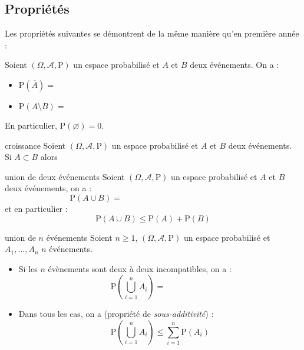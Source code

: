 \documentclass[french,11pt,twoside]{VcCours}
\renewcommand{\P}{\text{P}}
\begin{document}
 




\subsection{Propriétés}
Les propriétés suivantes se démontrent de la même manière qu'en première année : 

\begin{Proposition}{}\label{Prop1}
Soient $(\Omega, \mathcal{A}, \P)$ un espace probabilisé et $A$ et $B$ deux événements. On a :
\begin{itemize}
\item $\P(\overline{A})=$\phantom{$1-P(A)$.}
\item $\P(A \setminus B) =$\phantom{$\P(A)-P(A \cap B)$.}
\end{itemize}
\end{Proposition}

\begin{Remarque}{}
 En particulier, $\P(\varnothing)= 0$.
\end{Remarque}

\begin{Proposition}{croissance}
Soient $(\Omega, \mathcal{A}, \P)$ un espace probabilisé et $A$ et $B$ deux événements.\\
Si $A \subset B$ alors $\phantom{\P(A) \leq \P(B)}$
\end{Proposition}

\begin{Theoreme}{union de deux événements}
Soient $(\Omega, \mathcal{A}, \P)$ un espace probabilisé et $A$ et $B$ deux événements, on a :
$$\P(A \cup B)=\phantom{\P(A)+\P(B)-P(A \cap B)}$$
et en particulier :
$$ \P(A \cup B) \leq \P(A) + \P(B)$$
\end{Theoreme}

\begin{Theoreme}{union de $n$ événements}
Soient $n \geq 1$, $(\Omega, \mathcal{A}, \P)$ un espace probabilisé et $A_1, \ldots, A_n$ $n$ événements.
\begin{itemize}
\item Si les $n$ évènements sont deux à deux incompatibles, on a :
$$\P \left( \bigcup_{i=1}^n A_i\right)= \phantom{\sum_{i=1}^n \P(A_i)}$$
\item Dans tous les cas, on a (propriété de \emph{sous-additivité}) :
$$ \P \left(\bigcup_{i=1}^n A_i \right) \leq \sum_{i=1}^n \P(A_i) $$
\end{itemize}
\end{Theoreme}
\end{document}
